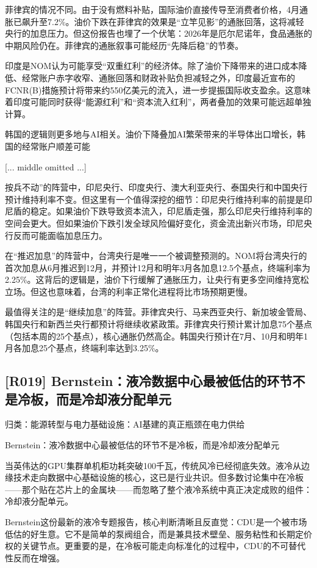 \documentclass[11pt]{ctexart}
\begin{document}
菲律宾的情况不同。由于没有燃料补贴，国际油价直接传导至消费者价格，4月通胀已飙升至7.2\%。油价下跌在菲律宾的效果是“立竿见影”的通胀回落，这将减轻央行的加息压力。但这份报告也埋了一个伏笔：2026年是厄尔尼诺年，食品通胀的中期风险仍在。菲律宾的通胀叙事可能经历“先降后稳”的节奏。

印度是NOM认为可能享受“双重红利”的经济体。除了油价下降带来的进口成本降低、经常账户赤字收窄、通胀回落和财政补贴负担减轻之外，印度最近宣布的FCNR(B)措施预计将带来约550亿美元的流入，进一步提振国际收支盈余。这意味着印度可能同时获得“能源红利”和“资本流入红利”，两者叠加的效果可能远超单独计算。

韩国的逻辑则更多地与AI相关。油价下降叠加AI繁荣带来的半导体出口增长，韩国的经常账户顺差可能

[... middle omitted ...]

按兵不动”的阵营中，印尼央行、印度央行、澳大利亚央行、泰国央行和中国央行预计维持利率不变。但这里有一个值得深挖的细节：印尼央行维持利率的前提是印尼盾的稳定。如果油价下跌导致资本流入，印尼盾走强，那么印尼央行维持利率的空间会更大。但如果油价下跌引发全球风险偏好变化，资金流出新兴市场，印尼央行反而可能面临加息压力。

在“推迟加息”的阵营中，台湾央行是唯一一个被调整预测的。NOM将台湾央行的首次加息从6月推迟到12月，并预计12月和明年3月各加息12.5个基点，终端利率为2.25\%。这背后的逻辑是，油价下行缓解了通胀压力，让央行有更多空间维持宽松立场。但这也意味着，台湾的利率正常化进程将比市场预期更慢。

最值得关注的是“继续加息”的阵营。菲律宾央行、马来西亚央行、新加坡金管局、韩国央行和新西兰央行都预计将继续收紧政策。菲律宾央行预计累计加息75个基点（包括本周的25个基点），核心通胀仍然高企。韩国央行预计在7月、10月和明年1月各加息25个基点，终端利率达到3.25\%。

\subsection{[R019] Bernstein：液冷数据中心最被低估的环节不是冷板，而是冷却液分配单元}
{\small\color{refgray}归类：能源转型与电力基础设施：AI基建的真正瓶颈在电力供给}

Bernstein：液冷数据中心最被低估的环节不是冷板，而是冷却液分配单元

当英伟达的GPU集群单机柜功耗突破100千瓦，传统风冷已经彻底失效。液冷从边缘技术走向数据中心基础设施的核心，这已是行业共识。但多数讨论集中在冷板——那个贴在芯片上的金属块——而忽略了整个液冷系统中真正决定成败的组件：冷却液分配单元。

Bernstein这份最新的液冷专题报告，核心判断清晰且反直觉：CDU是一个被市场低估的好生意。它不是简单的泵阀组合，而是兼具技术壁垒、服务粘性和长期定价权的关键节点。更重要的是，在冷板可能走向标准化的过程中，CDU的不可替代性反而在增强。
\end{document}
